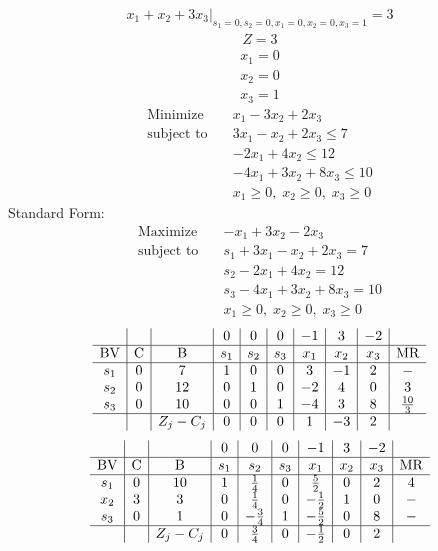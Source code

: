 \documentclass{article}
\begin{document}
\begin{align*}
\left.x_{1} + x_{2} + 3x_{3}\right|_{s_{1}=0,s_{2}=0,x_{1}=0,x_{2}=0,x_{3}=1}=3\end{align*}
\begin{align*}
Z=3\end{align*}
\begin{align*}
x_{1}=0\end{align*}
\begin{align*}
x_{2}=0\end{align*}
\begin{align*}
x_{3}=1\end{align*}
\begin{align*}
\text{Minimize} \quad & x_{1} - 3x_{2} + 2x_{3}\\
\text{subject to} \quad
& 3x_{1} - x_{2} + 2x_{3}\le7\\
& -2x_{1} + 4x_{2}\le12\\
& -4x_{1} + 3x_{2} + 8x_{3}\le10\\
& x_{1}\ge0,\; x_{2}\ge0,\; x_{3}\ge0\end{align*}
Standard Form:\\
\begin{align*}
\text{Maximize} \quad & -x_{1} + 3x_{2} - 2x_{3}\\
\text{subject to} \quad
& s_{1} + 3x_{1} - x_{2} + 2x_{3}=7\\
& s_{2} - 2x_{1} + 4x_{2}=12\\
& s_{3} - 4x_{1} + 3x_{2} + 8x_{3}=10\\
& x_{1}\ge0,\; x_{2}\ge0,\; x_{3}\ge0\end{align*}
\begin{align*}
\begin{array}{c|c|c|c|c|c|c|c|c|c}
 &  &  & 0 & 0 & 0 & -1 & 3 & -2 & \\
\hline
\text{BV} & \text{C} & \text{B} & s_{1} & s_{2} & s_{3} & x_{1} & x_{2} & x_{3} & \text{MR} \\
\hline
s_{1} & 0 & 7 & 1 & 0 & 0 & 3 & -1 & 2 & - \\
s_{2} & 0 & 12 & 0 & 1 & 0 & -2 & 4 & 0 & 3 \\
s_{3} & 0 & 10 & 0 & 0 & 1 & -4 & 3 & 8 & \frac{10}{3} \\
\hline
 &  & Z_j-C_j & 0 & 0 & 0 & 1 & -3 & 2 & \\
\end{array}
\end{align*}
\begin{align*}
\begin{array}{c|c|c|c|c|c|c|c|c|c}
 &  &  & 0 & 0 & 0 & -1 & 3 & -2 & \\
\hline
\text{BV} & \text{C} & \text{B} & s_{1} & s_{2} & s_{3} & x_{1} & x_{2} & x_{3} & \text{MR} \\
\hline
s_{1} & 0 & 10 & 1 & \frac{1}{4} & 0 & \frac{5}{2} & 0 & 2 & 4 \\
x_{2} & 3 & 3 & 0 & \frac{1}{4} & 0 & -\frac{1}{2} & 1 & 0 & - \\
s_{3} & 0 & 1 & 0 & -\frac{3}{4} & 1 & -\frac{5}{2} & 0 & 8 & - \\
\hline
 &  & Z_j-C_j & 0 & \frac{3}{4} & 0 & -\frac{1}{2} & 0 & 2 & \\
\end{array}
\end{align*}
\end{document}
